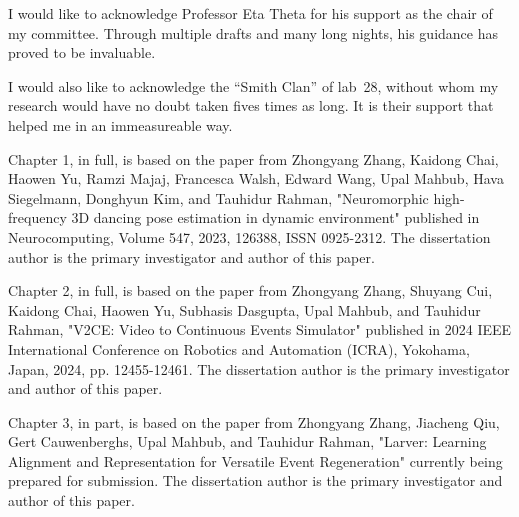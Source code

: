 \begin{acknowledgements}
I would like to acknowledge Professor Eta Theta for his support as the
chair of my committee. Through multiple drafts and many long nights,
his guidance has proved to be invaluable.

I would also like to acknowledge the ``Smith Clan'' of lab~28, without
whom my research would have no doubt taken fives times as long. It is
their support that helped me in an immeasureable way.

Chapter 1, in full, is based on the paper from Zhongyang Zhang, Kaidong Chai, Haowen Yu, Ramzi Majaj, Francesca Walsh, Edward Wang, Upal Mahbub, Hava Siegelmann, Donghyun Kim, and Tauhidur Rahman, "Neuromorphic high-frequency 3D dancing pose estimation in dynamic environment" published in Neurocomputing, Volume 547, 2023, 126388, ISSN 0925-2312. The dissertation author is the primary investigator and author of this paper.

Chapter 2, in full, is based on the paper from Zhongyang Zhang, Shuyang Cui, Kaidong Chai, Haowen Yu, Subhasis Dasgupta, Upal Mahbub, and Tauhidur Rahman, "V2CE: Video to Continuous Events Simulator" published in 2024 IEEE International Conference on Robotics and Automation (ICRA), Yokohama, Japan, 2024, pp. 12455-12461. The dissertation author is the primary investigator and author of this paper.

Chapter 3, in part, is based on the paper from Zhongyang Zhang, Jiacheng Qiu, 
Gert Cauwenberghs, Upal Mahbub, and Tauhidur Rahman, "Larver: Learning Alignment and Representation for Versatile Event Regeneration" currently being prepared for submission. The dissertation author is the primary investigator and author of this paper.
\end{acknowledgements}